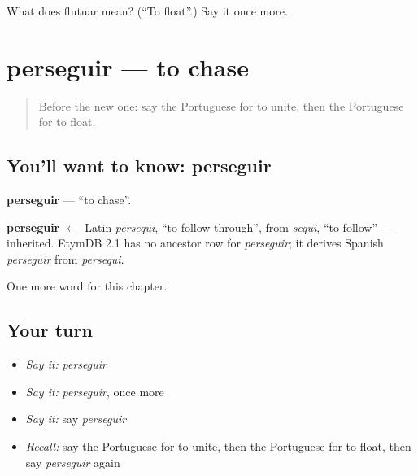 \begin{tcolorbox}[breakable,colback=teal!4,colframe=teal!35!black,title={Before you move on}]
What does flutuar mean? (\textquotedblleft{}To float\textquotedblright{}.) Say it once more.
\end{tcolorbox}
\section[perseguir]{perseguir — to chase}

\label{lesson:PT-C145-perseguir}



\begin{quote}
Before the new one: say the Portuguese for to unite, then the Portuguese for to float.
\end{quote}

\subsection*{You'll want to know: perseguir}
\textbf{perseguir} — \textquotedblleft{}to chase\textquotedblright{}.

\begin{cousinweb}
\textbf{perseguir} $\leftarrow$ Latin \emph{persequi}, \textquotedblleft{}to follow through\textquotedblright{}, from \emph{sequi}, \textquotedblleft{}to follow\textquotedblright{} — inherited. EtymDB 2.1 has no ancestor row for \emph{perseguir}; it derives Spanish \emph{perseguir} from \emph{persequi}.
\end{cousinweb}

\begin{grammarlens}[title={What you've built}]
One more word for this chapter.
\end{grammarlens}

\subsection*{Your turn}
\begin{itemize}
\raggedright
  \item \emph{Say it:} \emph{perseguir}
  \item \emph{Say it:} \emph{perseguir}, once more
  \item \emph{Say it:} say \emph{perseguir}
  \item \emph{Recall:} say the Portuguese for to unite, then the Portuguese for to float, then say \emph{perseguir} again
\end{itemize}

